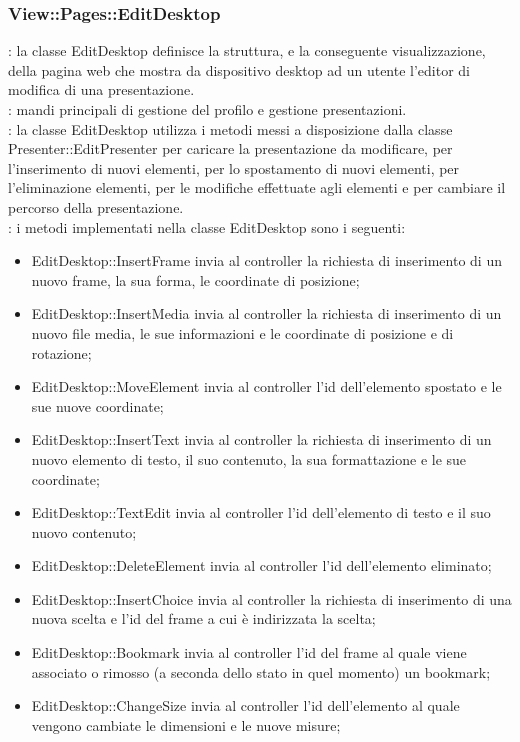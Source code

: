 {{		\subsubsection{View::Pages::EditDesktop}{
			\textbf{\tipo}: la classe EditDesktop definisce la struttura, e la conseguente visualizzazione, della pagina web che mostra da dispositivo desktop ad un utente  l'editor di modifica di una presentazione.\\
			\textbf{\relaz}: mandi principali di gestione del profilo e gestione presentazioni.\\	
			\textbf{\relaz}: la classe EditDesktop utilizza i metodi messi a disposizione dalla classe Presenter::EditPresenter per caricare la presentazione da modificare, per l'inserimento di nuovi elementi, per lo spostamento di nuovi elementi, per l'eliminazione elementi, per le modifiche  effettuate agli elementi e per cambiare il percorso della presentazione.\\
			\textbf{\interfacce}: i metodi implementati nella classe EditDesktop sono i seguenti:
			\begin{itemize}
				\item EditDesktop::InsertFrame invia al controller la richiesta di inserimento di un nuovo frame, la sua forma, le coordinate di posizione;
				\item EditDesktop::InsertMedia invia al controller la richiesta di inserimento di un nuovo file media, le sue informazioni e le coordinate di posizione e di rotazione;
				\item EditDesktop::MoveElement invia al controller l'id dell'elemento spostato e le sue nuove coordinate;
				\item EditDesktop::InsertText invia al controller la richiesta di inserimento di un nuovo elemento di testo, il suo contenuto, la sua formattazione e le sue coordinate;
				\item EditDesktop::TextEdit invia al controller l'id dell'elemento di testo e il suo nuovo contenuto;
				\item EditDesktop::DeleteElement invia al controller l'id dell'elemento eliminato;
				\item EditDesktop::InsertChoice invia al controller la richiesta di inserimento di una nuova scelta e l'id del frame a cui è indirizzata la scelta;
				\item EditDesktop::Bookmark invia al controller l'id del frame al quale viene associato o rimosso (a seconda dello stato in quel momento) un bookmark;
				\item EditDesktop::ChangeSize invia al controller l'id dell'elemento al quale vengono cambiate le dimensioni e le nuove misure;

\end{itemize}}}}
